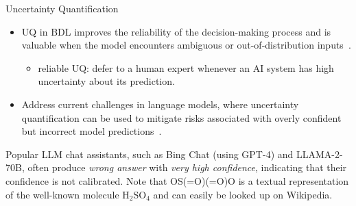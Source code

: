 \documentclass[9pt,handout]{beamer}
\begin{document}
\begin{frame}{Uncertainty Quantification}
\begin{itemize}[<+->]
	\item UQ in BDL improves the reliability of the decision-making process and is valuable when the model encounters ambiguous or \alert{out-of-distribution inputs}~\citep{tran2022plex}.
	\begin{itemize}
		\item \alert{reliable UQ}: defer to a human expert whenever an AI system has high uncertainty about its prediction.
	\end{itemize}
	\item Address current challenges in \alert{language models}, where uncertainty quantification can be used to mitigate risks associated with overly confident but incorrect model predictions~\citep{kadavath2022language}.
\end{itemize}
\pause

\begin{center}
\end{center}
Popular LLM chat assistants, such as Bing Chat (using GPT-4) and LLAMA-2-70B, often produce \emph{wrong answer} with \emph{very high confidence}, indicating that their confidence is not calibrated.
      Note that OS(=O)(=O)O is a textual representation of the well-known molecule H\(_2\)SO\(_4\) and can easily be looked up on Wikipedia.
\end{frame}
\end{document}
